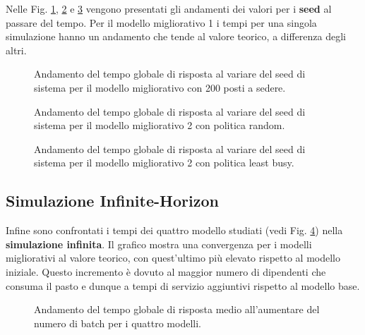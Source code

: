\documentclass{article}
\begin{document}
Nelle Fig. \ref{fig:ext_grt_seed_finite_200}, \ref{fig:ext_grt_seed_finite_m21} e \ref{fig:ext_grt_seed_finite_m22} vengono presentati gli andamenti dei valori per i \textbf{seed} al passare del tempo. 
Per il modello migliorativo 1 i tempi per una singola simulazione hanno un andamento che tende al valore teorico, a differenza degli altri.

\begin{figure}[H]
  \centering
  
  \caption{Andamento del tempo globale di risposta al variare del seed di sistema per il modello migliorativo con 200 posti a sedere.}
  \label{fig:ext_grt_seed_finite_200}
\end{figure}

\begin{figure}[H]
  \centering
  
  \caption{Andamento del tempo globale di risposta al variare del seed di sistema per il modello migliorativo 2 con politica random.}
  \label{fig:ext_grt_seed_finite_m21}
\end{figure}

\begin{figure}[H]
  \centering
  
  \caption{Andamento del tempo globale di risposta al variare del seed di sistema per il modello migliorativo 2 con politica least busy.}
  \label{fig:ext_grt_seed_finite_m22}
\end{figure}
\subsection{Simulazione Infinite-Horizon}
Infine sono confrontati i tempi dei quattro modello studiati (vedi Fig. \ref{fig:ext_grt_infinite_batch}) nella \textbf{simulazione infinita}.
Il grafico mostra una convergenza per i modelli migliorativi al valore teorico, con quest'ultimo più elevato rispetto al modello iniziale. 
Questo incremento è dovuto al maggior numero di dipendenti che consuma il pasto e dunque a tempi di servizio aggiuntivi rispetto al modello base. 

\begin{figure}[H]
  \centering
  
  \caption{Andamento del tempo globale di risposta medio all'aumentare del numero di batch per i quattro modelli.}
  \label{fig:ext_grt_infinite_batch}
\end{figure}
\end{document}
